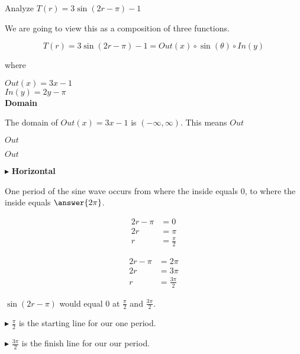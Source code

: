 \documentclass{ximera}
\begin{document}
\begin{example}



Analyze  $T(r) = 3 \sin(2r - \pi) - 1$





We are going to view this as a composition of three functions.


\[
T(r) = 3 \sin(2r - \pi) - 1 = Out(x) \circ \sin(\theta) \circ In(y)
\]


where


$Out(x) = 3x - 1$ \\

$In(y) = 2y - \pi$ \\







\textbf{\textcolor{blue!55!black}{Domain}}


The domain of $Out(x) = 3x - 1$ is $(-\infty, \infty)$.  This means $Out$




$Out$

$Out$




$\blacktriangleright$ \textbf{Horizontal}


One period of the sine wave occurs from where the inside equals $0$, to where the inside equals $\answer{2 \pi}$.


\begin{align*}
2r - \pi & =  0 \\
2r       & =  \pi \\
r        & =  \frac{\pi}{2}
\end{align*}



\begin{align*}
2r - \pi & =  2 \pi \\
2r       & =  3 \pi \\
r        & =  \frac{3 \pi}{2}
\end{align*}


$\sin(2r - \pi)$ would equal $0$ at $\frac{\pi}{2}$ and $\frac{3 \pi}{2}$.



$\blacktriangleright$ $\frac{\pi}{2}$ is the starting line for our one period.

$\blacktriangleright$ $\frac{3 \pi}{2}$ is the finish line for our our period.





\end{example}
\end{document}
